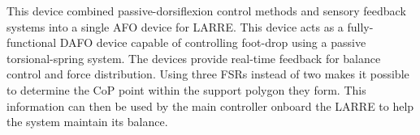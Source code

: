 This device combined passive-dorsiflexion control methods and sensory feedback systems into a single AFO device for LARRE. This device acts as a fully-functional DAFO device capable of controlling foot-drop using a passive torsional-spring system. The devices provide real-time feedback for balance control and force distribution.  Using three FSRs instead of two makes it possible to determine the CoP point within the support polygon they form.  This information can then be used by the main controller onboard the LARRE to help the system maintain its balance.

